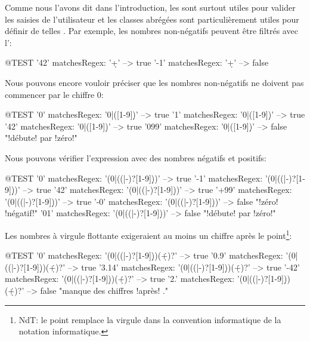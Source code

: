 \documentclass[a4paper,10pt,twoside]{book}
\begin{document}
Comme nous l'avons dit dans l'introduction, les \expregs sont surtout
utiles pour valider les saisies de l'utilisateur et les classes
abrégées sont particulièrement utiles pour définir de telles \expregs.
Par exemple, les nombres non-négatifs peuvent être filtrés avec
l'\expreg \ct{\d+}:

\begin{code}{@TEST}
'42' matchesRegex: '\d+' --> true
'-1' matchesRegex: '\d+' --> false
\end{code}

Nous pouvons encore vouloir préciser que les nombres non-négatifs ne
doivent pas commencer par le chiffre 0:

\begin{code}{@TEST}
'0' matchesRegex: '0|([1-9]\d*)'     --> true
'1' matchesRegex: '0|([1-9]\d*)'     --> true
'42' matchesRegex: '0|([1-9]\d*)'   --> true
'099' matchesRegex: '0|([1-9]\d*)' --> false    "!débute! par !zéro!"
\end{code}

\noindent{} Nous pouvons vérifier l'expression avec des nombres négatifs et positifs:

\begin{code}{@TEST}
'0' matchesRegex: '(0|((\+|-)?[1-9]\d*))'     --> true
'-1' matchesRegex: '(0|((\+|-)?[1-9]\d*))'   --> true
'42' matchesRegex: '(0|((\+|-)?[1-9]\d*))'   --> true
'+99' matchesRegex: '(0|((\+|-)?[1-9]\d*))' --> true
'-0' matchesRegex: '(0|((\+|-)?[1-9]\d*))'   --> false    "!zéro! !négatif!"
'01' matchesRegex: '(0|((\+|-)?[1-9]\d*))'   --> false    "!débute! par !zéro!"
\end{code}

Les nombres à virgule flottante exigeraient au moins un chiffre après
le point\footnote{NdT: le point remplace la virgule dans la convention
  informatique de la notation informatique.}: 

\begin{code}{@TEST}
'0' matchesRegex: '(0|((\+|-)?[1-9]\d*))(\.\d+)?'      --> true
'0.9' matchesRegex: '(0|((\+|-)?[1-9]\d*))(\.\d+)?'   --> true
'3.14' matchesRegex: '(0|((\+|-)?[1-9]\d*))(\.\d+)?' --> true
'-42' matchesRegex: '(0|((\+|-)?[1-9]\d*))(\.\d+)?'  --> true
'2.' matchesRegex: '(0|((\+|-)?[1-9]\d*))(\.\d+)?'     --> false "manque des chiffres !après! ."
\end{code}
\end{document}
